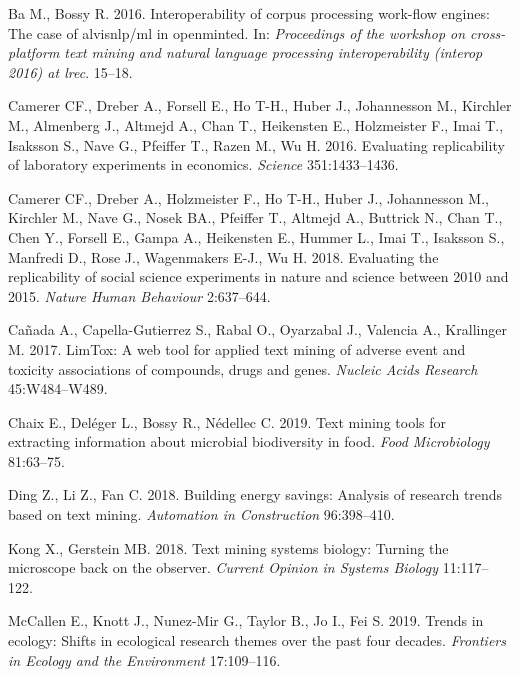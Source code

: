 \documentclass[author-year, review, 11pt]{components/elsarticle} %
\begin{document}
\hypertarget{refs}{}
\leavevmode\hypertarget{ref-ba2016interoperability}{}%
Ba M., Bossy R. 2016. Interoperability of corpus processing work-flow
engines: The case of alvisnlp/ml in openminted. In: \emph{Proceedings of
the workshop on cross-platform text mining and natural language
processing interoperability (interop 2016) at lrec}. 15--18.

\leavevmode\hypertarget{ref-Camerer2016}{}%
Camerer CF., Dreber A., Forsell E., Ho T-H., Huber J., Johannesson M.,
Kirchler M., Almenberg J., Altmejd A., Chan T., Heikensten E.,
Holzmeister F., Imai T., Isaksson S., Nave G., Pfeiffer T., Razen M., Wu
H. 2016. Evaluating replicability of laboratory experiments in
economics. \emph{Science} 351:1433--1436.

\leavevmode\hypertarget{ref-Camerer2018}{}%
Camerer CF., Dreber A., Holzmeister F., Ho T-H., Huber J., Johannesson
M., Kirchler M., Nave G., Nosek BA., Pfeiffer T., Altmejd A., Buttrick
N., Chan T., Chen Y., Forsell E., Gampa A., Heikensten E., Hummer L.,
Imai T., Isaksson S., Manfredi D., Rose J., Wagenmakers E-J., Wu H.
2018. Evaluating the replicability of social science experiments in
nature and science between 2010 and 2015. \emph{Nature Human Behaviour}
2:637--644.

\leavevmode\hypertarget{ref-Canada2017}{}%
Cañada A., Capella-Gutierrez S., Rabal O., Oyarzabal J., Valencia A.,
Krallinger M. 2017. LimTox: A web tool for applied text mining of
adverse event and toxicity associations of compounds, drugs and genes.
\emph{Nucleic Acids Research} 45:W484--W489.

\leavevmode\hypertarget{ref-Chaix2019}{}%
Chaix E., Deléger L., Bossy R., Nédellec C. 2019. Text mining tools for
extracting information about microbial biodiversity in food. \emph{Food
Microbiology} 81:63--75.

\leavevmode\hypertarget{ref-Ding2018}{}%
Ding Z., Li Z., Fan C. 2018. Building energy savings: Analysis of
research trends based on text mining. \emph{Automation in Construction}
96:398--410.

\leavevmode\hypertarget{ref-Kong2018}{}%
Kong X., Gerstein MB. 2018. Text mining systems biology: Turning the
microscope back on the observer. \emph{Current Opinion in Systems
Biology} 11:117--122.

\leavevmode\hypertarget{ref-McCallen2019}{}%
McCallen E., Knott J., Nunez-Mir G., Taylor B., Jo I., Fei S. 2019.
Trends in ecology: Shifts in ecological research themes over the past
four decades. \emph{Frontiers in Ecology and the Environment}
17:109--116.
\end{document}

